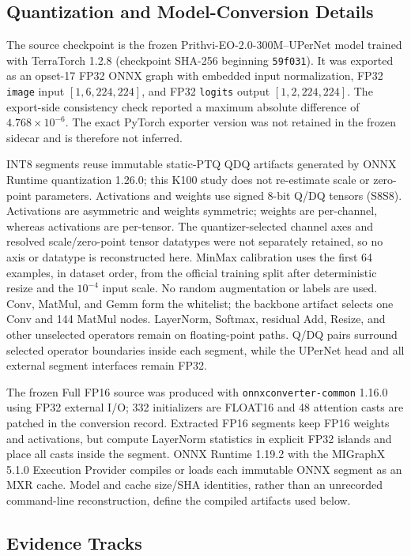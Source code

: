 \documentclass[conference]{IEEEtran}
\begin{document}
\subsection{Quantization and Model-Conversion Details}

The source checkpoint is the frozen Prithvi-EO-2.0-300M--UPerNet model trained with TerraTorch 1.2.8 (checkpoint SHA-256 beginning \texttt{59f031}). It was exported as an opset-17 FP32 ONNX graph with embedded input normalization, FP32 \texttt{image} input $[1,6,224,224]$, and FP32 \texttt{logits} output $[1,2,224,224]$. The export-side consistency check reported a maximum absolute difference of $4.768\times10^{-6}$. The exact PyTorch exporter version was not retained in the frozen sidecar and is therefore not inferred.

INT8 segments reuse immutable static-PTQ QDQ artifacts generated by ONNX Runtime quantization 1.26.0; this K100 study does not re-estimate scale or zero-point parameters. Activations and weights use signed 8-bit Q/DQ tensors (S8S8). Activations are asymmetric and weights symmetric; weights are per-channel, whereas activations are per-tensor. The quantizer-selected channel axes and resolved scale/zero-point tensor datatypes were not separately retained, so no axis or datatype is reconstructed here. MinMax calibration uses the first 64 examples, in dataset order, from the official training split after deterministic resize and the $10^{-4}$ input scale. No random augmentation or labels are used. Conv, MatMul, and Gemm form the whitelist; the backbone artifact selects one Conv and 144 MatMul nodes. LayerNorm, Softmax, residual Add, Resize, and other unselected operators remain on floating-point paths. Q/DQ pairs surround selected operator boundaries inside each segment, while the UPerNet head and all external segment interfaces remain FP32.

The frozen Full FP16 source was produced with \texttt{onnxconverter-common} 1.16.0 using FP32 external I/O; 332 initializers are FLOAT16 and 48 attention casts are patched in the conversion record. Extracted FP16 segments keep FP16 weights and activations, but compute LayerNorm statistics in explicit FP32 islands and place all casts inside the segment. ONNX Runtime 1.19.2 with the MIGraphX 5.1.0 Execution Provider compiles or loads each immutable ONNX segment as an MXR cache. Model and cache size/SHA identities, rather than an unrecorded command-line reconstruction, define the compiled artifacts used below.

\subsection{Evidence Tracks}
\end{document}

